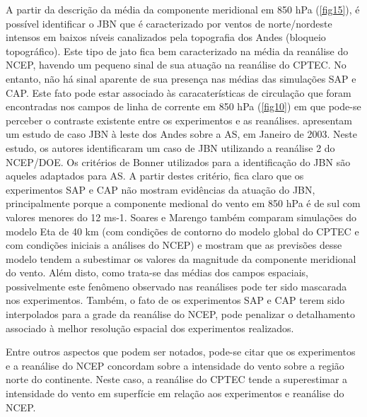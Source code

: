 A partir da descrição da média da componente meridional em 850 hPa (\autoref{fig15}), é possível identificar o JBN que é caracterizado por ventos de norte/nordeste intensos em baixos níveis canalizados pela topografia dos Andes (bloqueio topográfico). Este tipo de jato fica bem caracterizado na média da reanálise do NCEP, havendo um pequeno sinal de sua atuação na reanálise do CPTEC. No entanto, não há sinal aparente de sua presença nas médias das simulações SAP e CAP. Este fato pode estar associado às caracaterísticas de circulação que foram encontradas nos campos de linha de corrente em 850 hPa (\autoref{fig10}) em que pode-se perceber o contraste existente entre os experimentos e as reanálises.  apresentam um estudo de caso JBN à leste dos Andes sobre a AS, em Janeiro de 2003. Neste estudo, os autores identificaram um caso de JBN utilizando a reanálise 2 do NCEP/DOE. Os critérios de Bonner utilizados para a identificação do JBN são aqueles adaptados para AS. A partir destes critério, fica claro que os experimentos SAP e CAP não mostram evidências da atuação do JBN, principalmente porque a componente medional do vento em 850 hPa é de sul com valores menores do 12 ms-1. Soares e Marengo também comparam simulações do modelo Eta de 40 km (com condições de contorno do modelo global do CPTEC e com condições iniciais a análises do NCEP) e mostram que as previsões desse modelo tendem a subestimar os valores da magnitude da componente meridional do vento. Além disto, como trata-se das médias dos campos espaciais, possivelmente este fenômeno observado nas reanálises pode ter sido mascarada nos experimentos. Também, o fato de os experimentos SAP e CAP terem sido interpolados para a grade da reanálise do NCEP, pode penalizar o detalhamento associado à melhor resolução espacial dos experimentos realizados.

Entre outros aspectos que podem ser notados, pode-se citar que os experimentos e a reanálise do NCEP concordam sobre a intensidade do vento sobre a região norte do continente. Neste caso, a reanálise do CPTEC tende a superestimar a intensidade do vento em superfície em relação aos experimentos e reanálise do NCEP. 

